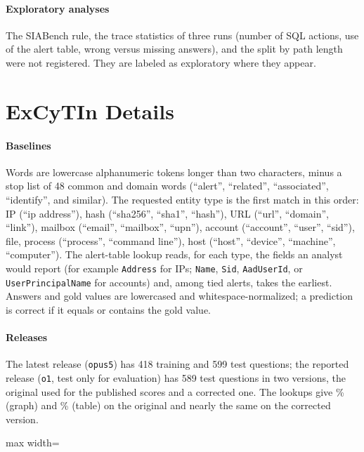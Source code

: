 \paragraph{Exploratory analyses} The SIABench rule, the trace statistics of three runs (number of SQL actions, use of the alert table, wrong versus missing answers), and the split by path length were not registered. They are labeled as exploratory where they appear.

\section{ExCyTIn Details}
\label{app:excytin}

\paragraph{Baselines} Words are lowercase alphanumeric tokens longer than two characters, minus a stop list of 48 common and domain words (``alert'', ``related'', ``associated'', ``identify'', and similar). The requested entity type is the first match in this order: IP (``ip address''), hash (``sha256'', ``sha1'', ``hash''), URL (``url'', ``domain'', ``link''), mailbox (``email'', ``mailbox'', ``upn''), account (``account'', ``user'', ``sid''), file, process (``process'', ``command line''), host (``host'', ``device'', ``machine'', ``computer''). The alert-table lookup reads, for each type, the fields an analyst would report (for example \texttt{Address} for IPs; \texttt{Name}, \texttt{Sid}, \texttt{AadUserId}, or \texttt{UserPrincipalName} for accounts) and, among tied alerts, takes the earliest. Answers and gold values are lowercased and whitespace-normalized; a prediction is correct if it equals or contains the gold value.

\paragraph{Releases} The latest release (\texttt{opus5}) has 418 training and 599 test questions; the reported release (\texttt{o1}, test only for evaluation) has 589 test questions in two versions, the original used for the published scores and a corrected one. The lookups give \oGraph\% (graph) and \oTable\% (table) on the original and nearly the same on the corrected version.

\begin{table}[h]
  \caption{Reported release: per-incident question counts, named and lookup rates (\%), and the reported mean reward (\%) of three models~\citep{excytin}.}
  \label{tab:incidents}
  \centering\footnotesize
  \begin{adjustbox}{max width=\columnwidth}\end{adjustbox}
\end{table}

